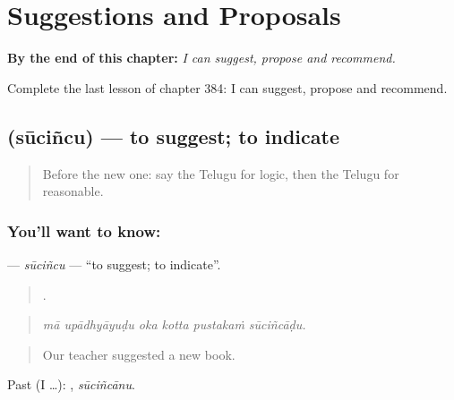 
\chapter{Suggestions and Proposals}
\label{ch:te-suggestions-and-proposals}

\begin{chapteropening}
\textbf{By the end of this chapter:} \emph{I can suggest, propose and recommend.}

Complete the last lesson of chapter 384: I can suggest, propose and recommend.
\end{chapteropening}

\section[\texorpdfstring{\te{సూచించు} (sūciñcu)}{సూచించు (sūciñcu)}]{ (sūciñcu) — to suggest; to indicate}

\label{lesson:TE-C384-sucincu}



\begin{quote}
Before the new one: say the Telugu for logic, then the Telugu for reasonable.
\end{quote}

\subsection*{You'll want to know: }
\textbf{} — \emph{sūciñcu} — \textquotedblleft{}to suggest; to indicate\textquotedblright{}.

\begin{quote}
     .
\end{quote}

\begin{quote}
\emph{mā upādhyāyuḍu oka kotta pustakaṁ sūciñcāḍu.}
\end{quote}

\begin{quote}
Our teacher suggested a new book.
\end{quote}

Past (I …): , \emph{sūciñcānu}.

